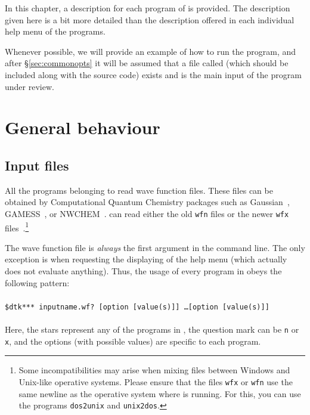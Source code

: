 In this chapter, a description for each program of \DTK{} is provided. The description given here is a bit more detailed than the description offered in each individual help menu of the programs.

Whenever possible, we will provide an example of how to run the program, and after \S\ref{sec:commonopts} it will be assumed that a file called
\wfexfile{} (which should be included along with the source code) exists and is the main input of the program under review.

\section{General behaviour}

\subsection{Input files}

All the programs belonging to \DTK{} read wave function files. These files can be obtained by Computational Quantum Chemistry packages such as Gaussian~\cite{bib:gaussian09}, GAMESS~\cite{bib:gamess}, or NWCHEM~\cite{bib:nwchem}. \DTK{} can read either the old \texttt{wfn} files or the newer \texttt{wfx} files~\cite{bib:webwfxformat}.\footnote{Some incompatibilities may arise when mixing files between Windows and Unix-like operative systems. Please ensure that the files \texttt{wfx} or \texttt{wfn} use the same newline as the operative system where \DTK{} is running. For this, you can use the programs \texttt{dos2unix} and \texttt{unix2dos}.}

The wave function file is \textit{always} the first argument in the command line. The only exception is when requesting the displaying of the help menu (which actually does not evaluate anything). Thus, the usage of every program in \DTK{} obeys the following pattern:\\\phantom{as}\\
\phantom{MMM}\texttt{\$dtk*** inputname.wf? [option [value(s)]] \dots [option [value(s)]]}\\
\phantom{a}\\
Here, the stars represent any of the programs in \DTK, the question mark can be \texttt{n} or \texttt{x}, and the options (with possible values) are specific to each program.

